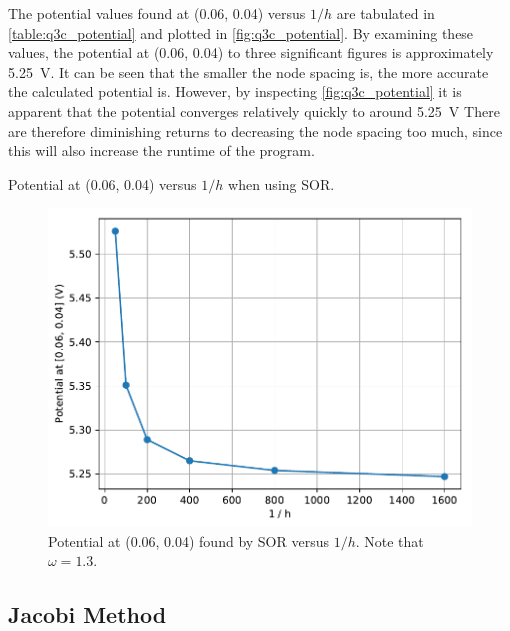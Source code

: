 \documentclass[a4paper,titlepage]{article}
\begin{document}
	The potential values found at (0.06, 0.04) versus $1/h$ are tabulated in \autoref{table:q3c_potential} and plotted in \autoref{fig:q3c_potential}. By examining these values, the potential at (0.06, 0.04) to three significant figures is approximately \SI{5.25}{\volt}. It can be seen that the smaller the node spacing is, the more accurate the calculated potential is. However, by inspecting \autoref{fig:q3c_potential} it is apparent that the potential converges relatively quickly to around \SI{5.25}{\volt} There are therefore diminishing returns to decreasing the node spacing too much, since this will also increase the runtime of the program.

	\begin{table}[!htb]
		\centering
		\caption{Potential at (0.06, 0.04) versus $1/h$ when using SOR.}
		\label{table:q3c_potential}
	\end{table}

	\begin{figure}[!htb]
		\centering
		\includegraphics[width=\columnwidth]{plots/q3c_potential.pdf}
		\caption
		{Potential at (0.06, 0.04) found by SOR versus $1/h$. Note that $\omega=1.3$.}
		\label{fig:q3c_potential}
	\end{figure}
	
	\subsection{Jacobi Method}
	
\end{document}
